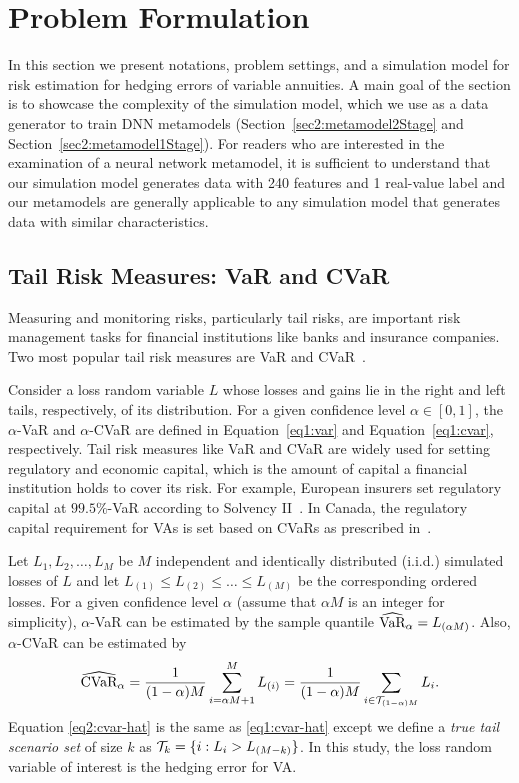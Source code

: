\section{Problem Formulation} \label{sec2:problem-formulation}

In this section we present notations, problem settings, and a simulation model for risk estimation for hedging errors of variable annuities.
A main goal of the section is to showcase the complexity of the simulation model, which we use as a data generator to train DNN metamodels (Section~\ref{sec2:metamodel2Stage} and Section~\ref{sec2:metamodel1Stage}).
For readers who are interested in the examination of a neural network metamodel, it is sufficient to understand that our simulation model generates data with 240 features and 1 real-value label and our metamodels are generally applicable to any simulation model that generates data with similar characteristics.

\subsection{Tail Risk Measures: VaR and CVaR}
Measuring and monitoring risks, particularly tail risks, are important risk management tasks for financial institutions like banks and insurance companies.
Two most popular tail risk measures are VaR and CVaR~\citep{hardy2022quantitative, rockafellar2002conditional}. 

Consider a loss random variable $L$ whose losses and gains lie in the right and left tails, respectively, of its distribution.
For a given confidence level $\alpha\in [0,1]$, the $\alpha$-VaR and $\alpha$-CVaR are defined in Equation~\eqref{eq1:var} and Equation~\eqref{eq1:cvar}, respectively.
Tail risk measures like VaR and CVaR are widely used for setting regulatory and economic capital, which is the amount of capital a financial institution holds to cover its risk.
For example, European insurers set regulatory capital at $99.5\%$-VaR according to Solvency II~\cite{eiopa2014underlying}.
In Canada, the regulatory capital requirement for VAs is set based on CVaRs as prescribed in~\cite{osfi2017life}.

Let $L_1,L_2,\ldots,L_M$ be $M$ independent and identically distributed (i.i.d.) simulated losses of $L$ and let $L_{(1)}\leq L_{(2)}\leq \ldots\leq L_{(M)}$ be the corresponding ordered losses.
For a given confidence level $\alpha$ (assume that $\alpha M$ is an integer for simplicity), $\alpha$-VaR can be estimated by the sample quantile $\widehat{\mbox{VaR}}_\alpha = L_{(\alpha M)}$. Also, $\alpha$-CVaR can be estimated by
\begin{equation} \label{eq2:cvar-hat}
    \widehat{\mbox{CVaR}}_\alpha = \frac{1}{(1-\alpha)M} \sum_{i=\alpha M + 1}^{M}L_{(i)} = \frac{1}{(1-\alpha)M} \sum_{i \in \mathcal{T}_{(1-\alpha )M}}L_{i}.
\end{equation}
Equation \eqref{eq2:cvar-hat} is the same as \eqref{eq1:cvar-hat} except we define a \textit{true tail scenario set} of size $k$ as $\mathcal{T}_{k} = \{i: L_i > L_{(M-k)}\}$.
In this study, the loss random variable of interest is the hedging error for VA.

